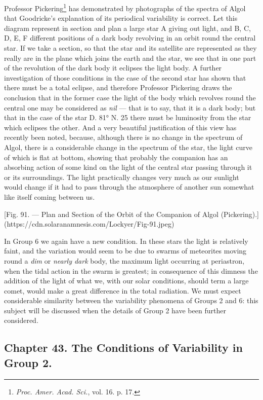 \documentclass[a4paper, 12pt, oneside, polutonikogreek, english]{article}
\begin{document}
Professor Pickering\footnote{\emph{Proc. Amer. Acad. Sci.}, vol. 16. p. 17.} has demonstrated by photographs of the spectra of Algol that Goodricke's explanation of its periodical variability is correct. Let this diagram represent in section and plan a large star A giving out light, and B, C, D, E, F different positions of a dark body revolving in an orbit round the central star. If we take a section, so that the star and its satellite are represented as they really are in the plane which joins the earth and the star, we see that in one part of the revolution of the dark body it eclipses the light body. A further investigation of those conditions in the case of the second star has shown that there must be a total eclipse, and therefore Professor Pickering draws the conclusion that in the former case the light of the body which revolves round the central one may be considered as \emph{nil} --- that is to say, that it is a dark body; but that in the case of the star D. 81° N. 25 there must be luminosity from the star which eclipses the other. And a very beautiful justification of this view has recently been noted, because, although there is no change in the spectrum of Algol, there is a considerable change in the spectrum of the star, the light curve of which is flat at bottom, showing that probably the companion has an absorbing action of some kind on the light of the central star passing through it or its surroundings. The light practically changes very much as our sunlight would change if it had to pass through the atmosphere of another sun somewhat like itself coming between us.

[Fig. 91. --- Plan and Section of the Orbit of the Companion of Algol (Pickering).](https://cdn.solaranamnesis.com/Lockyer/Fig-91.jpeg)

In Group 6 we again have a new condition. In these stars the light is relatively faint, and the variation would seem to be due to swarms of meteorites moving round a \emph{dim} or \emph{nearly dark} body, the maximum light occurring at periastron, when the tidal action in the swarm is greatest; in consequence of this dimness the addition of the light of what we, with our solar conditions, should term a large comet, would make a great difference in the total radiation. We must expect considerable similarity between the variability phenomena of Groups 2 and 6: this subject will be discussed when the details of Group 2 have been further considered.
\clearpage
\subsection{Chapter 43. The Conditions of Variability in Group 2.}
\end{document}
